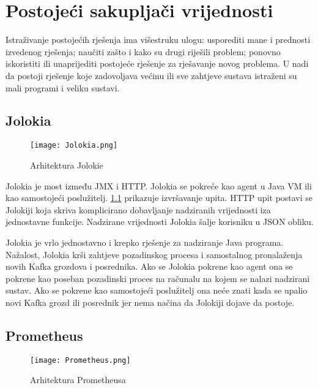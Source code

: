 \documentclass[utf8, diplomski, lmodern, numeric]{fer}
\begin{document}
\chapter{Postojeći sakupljači vrijednosti}

Istraživanje postojećih rješenja ima višestruku ulogu: usporediti mane i prednosti izvedenog rješenja; naučiti zašto i kako su drugi riješili problem; ponovno iskoristiti ili unaprijediti postojeće rješenje za rješavanje novog problema. U nadi da postoji rješenje koje zadovoljava većinu ili sve zahtjeve sustava istraženi su mali programi i veliku sustavi.


\section{Jolokia}

\begin{figure}[H]
    \centering
    \texttt{[image: Jolokia.png]}
    \caption{Arhitektura Jolokie}
    \label{fig:jolokia}
\end{figure}

Jolokia \citep{jolokia} je most između JMX i HTTP. Jolokia se pokreće kao agent u Java VM ili kao samostojeći poslužitelj. \ref{fig:jolokia} prikazuje izvršavanje upita. HTTP upit postavi se Jolokiji koja skriva komplicirano dobavljanje nadziranih vrijednosti iza jednostavne funkcije. Nadzirane vrijednosti Jolokia šalje korisniku u JSON obliku.

Jolokia je vrlo jednostavno i krepko rješenje za nadziranje Java programa. Nažalost, Jolokia krši zahtjeve pozadinskog procesa i samostalnog pronalaženja novih Kafka grozdova i posrednika. Ako se Jolokia pokrene kao agent ona se pokrene kao poseban pozadinski proces na računalu na kojem se nalazi nadzirani sustav. Ako se pokrene kao samostojeći poslužitelj ona neće znati kada se upalio novi Kafka grozd ili posrednik jer nema načina da Jolokiji dojave da postoje.


\section{Prometheus}

\begin{figure}[H]
    \centering
    \texttt{[image: Prometheus.png]}
    \caption{Arhitektura Prometheusa}
    \label{fig:prometheus}
\end{figure}
\end{document}
